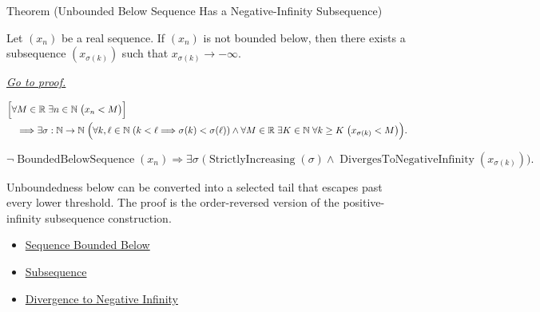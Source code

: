 
\begin{theorembox}{Theorem (Unbounded Below Sequence Has a Negative-Infinity Subsequence)}
\begin{theorem}
\label{thm:unbounded-below-has-negative-infinity-subsequence}
Let $(x_n)$ be a real sequence. If $(x_n)$ is not bounded below, then
there exists a subsequence $(x_{\sigma(k)})$ such that
$x_{\sigma(k)}\to-\infty$.

\smallskip
\noindent
\hyperref[prf:unbounded-below-has-negative-infinity-subsequence]{\textit{Go to proof.}}
\end{theorem}
\end{theorembox}

\begin{remark*}
\[
\begin{aligned}
&\Bigl[
  \forall M\in\mathbb{R}\;\exists n\in\mathbb{N}\;\bigl(x_n<M\bigr)
\Bigr]\\
&\quad\Longrightarrow
\exists \sigma:\mathbb{N}\to\mathbb{N}\;
\Bigl(
  \forall k,\ell\in\mathbb{N}\;(k<\ell\Longrightarrow \sigma(k)<\sigma(\ell))
  \land
  \forall M\in\mathbb{R}\;\exists K\in\mathbb{N}\;\forall k\ge K
  \;\bigl(x_{\sigma(k)}<M\bigr)
\Bigr).
\end{aligned}
\]
\end{remark*}

\begin{remark*}
\[
\neg\operatorname{BoundedBelowSequence}(x_n)
\Longrightarrow
\exists \sigma\;
\bigl(
  \operatorname{StrictlyIncreasing}(\sigma)
  \land
  \operatorname{DivergesToNegativeInfinity}(x_{\sigma(k)})
\bigr).
\]
\end{remark*}

\begin{remark*}[Interpretation]
Unboundedness below can be converted into a selected tail that escapes past
every lower threshold. The proof is the order-reversed version of the
positive-infinity subsequence construction.
\end{remark*}

\begin{remark*}[Dependencies]\hfill
\begin{itemize}
  \item \hyperref[def:sequence-bounded-below]{Sequence Bounded Below}
  \item \hyperref[def:subsequence]{Subsequence}
  \item \hyperref[def:diverges-to-negative-infinity]{Divergence to Negative Infinity}
\end{itemize}
\end{remark*}

